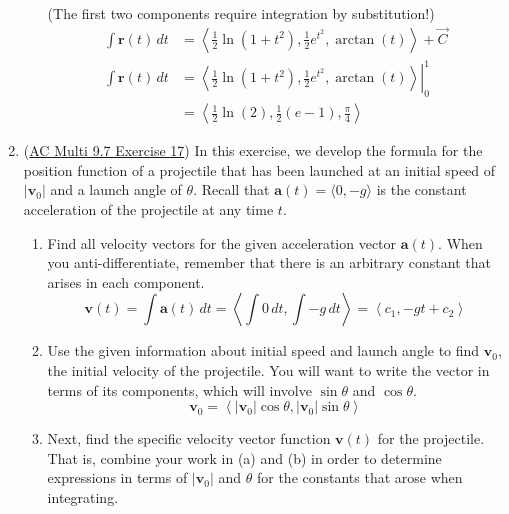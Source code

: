 \documentclass[10pt]{article}
\newcommand{\va}{\mathbf{a}}
\newcommand{\vv}{\mathbf{v}}
\newcommand{\vr}{\mathbf{r}}
\newenvironment{red}{\color{red}}{\ignorespacesafterend}
\begin{document}
\begin{enumerate}[leftmargin=0pt]
\begin{enumerate}
    \begin{red}
        (The first two components require integration by substitution!)
        \begin{align*}
            \int\vr(t)\, dt &= \left\langle
                \frac12 \ln(1+t^2),
                \frac12 e^{t^2},
                \arctan(t)
            \right\rangle + \vec{C}\\
            \int\vr(t)\, dt &= \left.\left\langle
                \frac12 \ln(1+t^2),
                \frac12 e^{t^2},
                \arctan(t)
            \right\rangle \right|_0^1 \\
            &= \left\langle
                \frac12 \ln(2),
                \frac12 (e - 1),
                \frac{\pi}{4}
            \right\rangle
        \end{align*}
    \end{red}
\end{enumerate}

\item (\href{https://activecalculus.org/multi/S-9-7-Vector-Valued-Functions-Derivatives.html#Ez_9_7_5}{AC Multi 9.7 Exercise 17}) In this exercise, we develop the formula for the position function of a projectile that has been launched at an initial speed of $|\vv_0|$ and a launch angle of $\theta$. Recall that $\va(t) = \langle 0, -g\rangle$ is the constant acceleration of the projectile at any time $t$.
\begin{enumerate}
    \item Find all velocity vectors for the given acceleration vector $\va(t)$. When you anti-differentiate, remember that there is an arbitrary constant that arises in each component.
    \begin{red}
        \begin{equation*}
            \vv(t) = \int \va(t)\, dt = \left\langle
                \int 0\, dt,
                \int -g\, dt
            \right\rangle
            = \left\langle
                c_1, -gt + c_2
            \right\rangle
        \end{equation*}
    \end{red}
    \item Use the given information about initial speed and launch angle to find $\vv_0$, the initial velocity of the projectile. You will want to write the vector in terms of its components, which will involve $\sin\theta$ and $\cos\theta$.
    \begin{red}
        \begin{equation*}
            \vv_0 = 
            \left\langle |\vv_0|\cos\theta, |\vv_0|\sin\theta \right\rangle 
        \end{equation*}
    \end{red}
    \item Next, find the specific velocity vector function $\vv(t)$ for the projectile. That is, combine your work in (a) and (b) in order to determine expressions in terms of $|\vv_0|$ and $\theta$ for the constants that arose when integrating.


\end{enumerate}
\end{enumerate}
\end{document}
